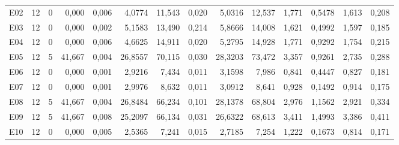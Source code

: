 \begin{singlespace}
\begin{longtable}{@{}lrrrrrrrrrrrrr@{}}
E02 & 12 & 0 & 0{,}000 & 0{,}006 & 4{,}0774 & 11{,}543 & 0{,}020 & 5{,}0316 & 12{,}537 & 1{,}771 & 0{,}5478 & 1{,}613 & 0{,}208\\
E03 & 12 & 0 & 0{,}000 & 0{,}002 & 5{,}1583 & 13{,}490 & 0{,}214 & 5{,}8666 & 14{,}008 & 1{,}621 & 0{,}4992 & 1{,}597 & 0{,}185\\
E04 & 12 & 0 & 0{,}000 & 0{,}006 & 4{,}6625 & 14{,}911 & 0{,}020 & 5{,}2795 & 14{,}928 & 1{,}771 & 0{,}9292 & 1{,}754 & 0{,}215\\
E05 & 12 & 5 & 41{,}667 & 0{,}004 & 26{,}8557 & 70{,}115 & 0{,}030 & 28{,}3203 & 73{,}472 & 3{,}357 & 0{,}9261 & 2{,}735 & 0{,}288\\
E06 & 12 & 0 & 0{,}000 & 0{,}001 & 2{,}9216 & 7{,}434 & 0{,}011 & 3{,}1598 & 7{,}986 & 0{,}841 & 0{,}4447 & 0{,}827 & 0{,}181\\
E07 & 12 & 0 & 0{,}000 & 0{,}001 & 2{,}9976 & 8{,}632 & 0{,}011 & 3{,}0912 & 8{,}641 & 0{,}928 & 0{,}1492 & 0{,}914 & 0{,}175\\
E08 & 12 & 5 & 41{,}667 & 0{,}004 & 26{,}8484 & 66{,}234 & 0{,}101 & 28{,}1378 & 68{,}804 & 2{,}976 & 1{,}1562 & 2{,}921 & 0{,}334\\
E09 & 12 & 5 & 41{,}667 & 0{,}008 & 25{,}2097 & 66{,}134 & 0{,}031 & 26{,}6322 & 68{,}613 & 3{,}411 & 1{,}4993 & 3{,}386 & 0{,}411\\
E10 & 12 & 0 & 0{,}000 & 0{,}005 & 2{,}5365 & 7{,}241 & 0{,}015 & 2{,}7185 & 7{,}254 & 1{,}222 & 0{,}1673 & 0{,}814 & 0{,}171\\
\end{longtable}
\endgroup
{}
\end{singlespace}
